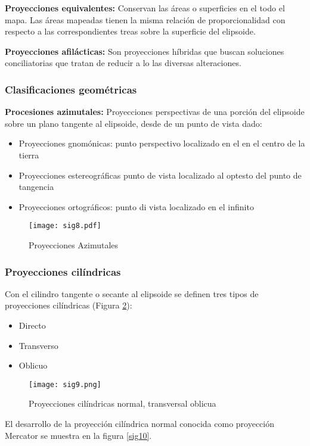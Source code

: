 \textbf{Proyecciones equivalentes:} Conservan las áreas o superficies en el todo el mapa. Las áreas mapeadas tienen la misma relación de proporcionalidad con respecto a las correspondientes treas sobre la superficie del elipsoide.

\textbf{Proyecciones afilácticas:} Son proyecciones híbridas que buscan soluciones conciliatorias que tratan de reducir a lo las diversas alteraciones.

\subsubsection{Clasificaciones geométricas}

\textbf{Procesiones azimutales:} Proyecciones perspectivas de una porción del elipsoide sobre un plano tangente al elipsoide, desde de un punto de vista dado: 
\begin{itemize}
    \item Proyecciones gnomónicas: punto perspectivo localizado en el en el centro de la tierra
    \item Proyecciones estereográficas punto de vista localizado al optesto del punto de tangencia
    \item Proyecciones ortográficos: punto di vista localizado en el infinito
\end{itemize}
\begin{figure}[h!]
\centering
  \texttt{[image: sig8.pdf]}
  \caption{Proyecciones Azimutales}
  \label{sig8}
\end{figure}

\subsubsection{Proyecciones cilíndricas}
Con el cilindro tangente o secante al elipsoide se definen tres tipos de proyecciones cilíndricas (Figura \ref{sig9}): 
\begin{itemize}
  \item Directo
  \item Transverso
  \item Oblicuo
\end{itemize}
\begin{figure}[h!]
\centering
\texttt{[image: sig9.png]}
\caption{Proyecciones cilíndricas normal, transversal oblicua}
\label{sig9}
\end{figure}

El desarrollo de la proyección cilíndrica normal conocida como proyección Mercator se  muestra en la figura \ref{sig10}. 


